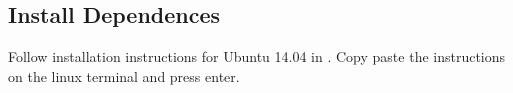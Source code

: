 \documentclass[journal,12pt,twocolumn]{IEEEtran}
\begin{document}
\subsection{Install Dependences}
Follow installation instructions for Ubuntu 14.04 in \cite{ettus}.  Copy paste the instructions on the linux terminal and press enter.
%
\end{document}
